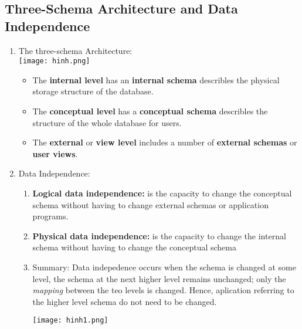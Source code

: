 \documentclass[10pt]{article}
\begin{document}
\subsection{Three-Schema Architecture and Data Independence}
\begin{enumerate}
	\item The three-schema Architecture: \\
	
	\texttt{[image: hinh.png]}

	\begin{itemize}
		\item The \textbf{internal level} has an \textbf{internal schema} describles the physical storage structure of the database.
		\item The \textbf{conceptual level} has a \textbf{conceptual schema} describles the structure of the whole database for users.
		\item The \textbf{external} or \textbf{view level} includes a number of \textbf{external schemas} or \textbf{user views}.
	\end{itemize}

	\item Data Independence: 
	\begin{enumerate}
		\item \textbf{Logical data independence:} is the capacity to change the conceptual schema without having to change external schemas or application programs.
		\item \textbf{Physical data independence:} is the capacity to change the internal schema without having to change the conceptual schema
		\item Summary: Data indepedence occurs when the schema is changed at some level, the schema at the next higher level remains unchanged; only the \textit{mapping} between the teo levels is changed. Hence, aplication referring to the higher level schema do not need to be changed.

		\bigbreak
		\texttt{[image: hinh1.png]}
		\bigbreak 
	\end{enumerate}
\end{enumerate}
\end{document}
